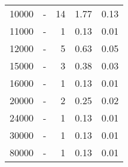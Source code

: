 \begin{longtable}{lXrrr}
        10000 & \multicolumn{1}{X}{-} & %
          \num{14} &
          \num[round-mode=places,round-precision=2]{1,77} &
          \num[round-mode=places,round-precision=2]{0,13} \\

        11000 & \multicolumn{1}{X}{-} & %
          \num{1} &
          \num[round-mode=places,round-precision=2]{0,13} &
          \num[round-mode=places,round-precision=2]{0,01} \\

        12000 & \multicolumn{1}{X}{-} & %
          \num{5} &
          \num[round-mode=places,round-precision=2]{0,63} &
          \num[round-mode=places,round-precision=2]{0,05} \\

        15000 & \multicolumn{1}{X}{-} & %
          \num{3} &
          \num[round-mode=places,round-precision=2]{0,38} &
          \num[round-mode=places,round-precision=2]{0,03} \\

        16000 & \multicolumn{1}{X}{-} & %
          \num{1} &
          \num[round-mode=places,round-precision=2]{0,13} &
          \num[round-mode=places,round-precision=2]{0,01} \\

        20000 & \multicolumn{1}{X}{-} & %
          \num{2} &
          \num[round-mode=places,round-precision=2]{0,25} &
          \num[round-mode=places,round-precision=2]{0,02} \\

        24000 & \multicolumn{1}{X}{-} & %
          \num{1} &
          \num[round-mode=places,round-precision=2]{0,13} &
          \num[round-mode=places,round-precision=2]{0,01} \\

        30000 & \multicolumn{1}{X}{-} & %
          \num{1} &
          \num[round-mode=places,round-precision=2]{0,13} &
          \num[round-mode=places,round-precision=2]{0,01} \\

        80000 & \multicolumn{1}{X}{-} & %
          \num{1} &
          \num[round-mode=places,round-precision=2]{0,13} &
          \num[round-mode=places,round-precision=2]{0,01} \\


\end{longtable}
